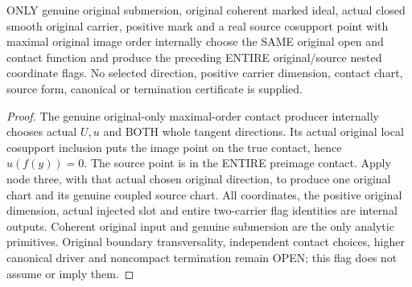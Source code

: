 \begin{theorem}
\label{hir:submersion-contact-coordinates-original-only-consumer}
\leanok
ONLY genuine original submersion, original coherent marked ideal, actual
closed smooth original carrier, positive mark and a real source cosupport
point with maximal original image order internally choose the SAME original
open and contact function and produce the preceding ENTIRE original/source
nested coordinate flags. No selected direction, positive carrier dimension,
contact chart, source form, canonical or termination certificate is supplied.
\end{theorem}
\begin{proof}
The genuine original-only maximal-order contact producer internally chooses
actual $U,u$ and BOTH whole tangent directions. Its actual original local
cosupport inclusion puts the image point on the true contact, hence
$u(f(y))=0$. The source point is in the ENTIRE preimage contact. Apply node
three, with that actual chosen original direction, to produce one original
chart and its genuine coupled source chart. All coordinates, the positive
original dimension, actual injected slot and entire two-carrier flag
identities are internal outputs. Coherent original input and genuine
submersion are the only analytic primitives. Original boundary transversality,
independent contact choices, higher canonical driver and noncompact
termination remain OPEN; this flag does not assume or imply them.
\end{proof}

